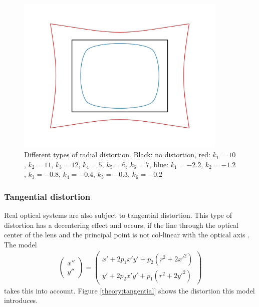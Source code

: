 \begin{figure}[ht]
	\centering
	\includegraphics[width=0.9\textwidth]{2-theory/distortion/radial.png}
	\caption{Different types of radial distortion. Black: no distortion, red: $k_1 = 10$, $k_2=11$, $k_3=12$, $k_4=5$, $k_5=6$, $k_6=7$, blue: $k_1 = -2.2$, $k_2=-1.2$, $k_3=-0.8$, $k_4=-0.4$, $k_5=-0.3$, $k_6=-0.2$\label{theory:radial}}
\end{figure} 

\subsubsection{Tangential distortion}
Real optical systems are also subject to tangential distortion. This type of distortion has a decentering effect and occurs, if the line through the optical center of the lens and the principal point is not col-linear with the optical axis \cite{weng}.
The model
\begin{align}
\begin{pmatrix}
x''\\
y''
\end{pmatrix}=
\begin{pmatrix}
x' + 2p_1x'y'+p_2(r^2+2x'^2)\\
y' + 2p_2x'y'+p_1(r^2+2y'^2)
\end{pmatrix}\label{theory:tandist}
\end{align}
takes this into account.
Figure \ref{theory:tangential} shows the distortion this model introduces.

